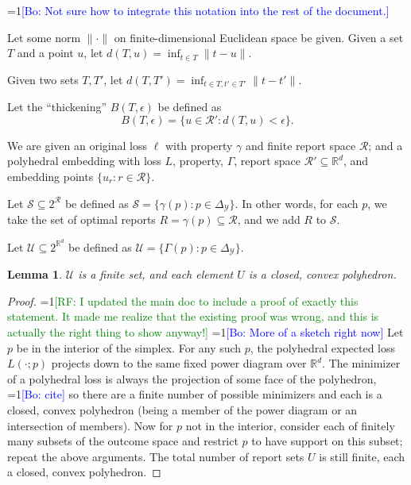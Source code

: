 \documentclass{article}
\newcommand{\Comments}{1}
\newcommand{\mynote}[2]{\ifnum\Comments=1\textcolor{#1}{#2}\fi}
\newcommand{\raf}[1]{\mynote{green}{[RF: #1]}}
\newcommand{\bo}[1]{\mynote{blue}{[Bo: #1]}}
\newcommand{\reals}{\mathbb{R}}
\newcommand{\R}{\mathcal{R}}
\newcommand{\Y}{\mathcal{Y}}
\newtheorem{lemma}{Lemma}
\theoremstyle{definition}
\begin{document}
\bo{Not sure how to integrate this notation into the rest of the document.}

Let some norm $\|\cdot\|$ on finite-dimensional Euclidean space be given.
Given a set $T$ and a point $u$, let $d(T,u) = \inf_{t \in T} \|t-u\|$.

Given two sets $T,T'$, let $d(T,T') = \inf_{t\in T, t' \in T'} \|t-t'\|$.

Let the ``thickening'' $B(T,\epsilon)$ be defined as
  \[ B(T,\epsilon) = \{u \in \R' : d(T,u) < \epsilon \} . \]

We are given an original loss $\ell$ with property $\gamma$ and finite report space $\R$; and a polyhedral embedding with loss $L$, property, $\Gamma$, report space $\R' \subseteq \reals^d$, and embedding points $\{u_r : r \in \R\}$.


Let $\mathcal{S} \subseteq 2^{\R}$ be defined as $\mathcal{S} = \{\gamma(p) : p \in \Delta_{\Y}\}$.
In other words, for each $p$, we take the set of optimal reports $R = \gamma(p) \subseteq \R$, and we add $R$ to $\mathcal{S}$.

Let $\mathcal{U} \subseteq 2^{\reals^d}$ be defined as $\mathcal{U} = \{\Gamma(p) : p \in \Delta_{\Y}\}$.

\begin{lemma} \label{lemma:U-convex-closed}
  $\mathcal{U}$ is a finite set, and each element $U$ is a closed, convex polyhedron.
\end{lemma}
\begin{proof}
  \raf{I updated the main doc to include a proof of exactly this statement.  It made me realize that the existing proof was wrong, and this is actually the right thing to show anyway!}
  \bo{More of a sketch right now}
  Let $p$ be in the interior of the simplex.
  For any such $p$, the polyhedral expected loss $L(\cdot;p)$ projects down to the same fixed power diagram over $\reals^d$.
  The minimizer of a polyhedral loss is always the projection of some face of the polyhedron, \bo{cite} so there are a finite number of possible minimizers and each is a closed, convex polyhedron (being a member of the power diagram or an intersection of members).
  Now for $p$ not in the interior, consider each of finitely many subsets of the outcome space and restrict $p$ to have support on this subset; repeat the above arguments.
  The total number of report sets $U$ is still finite, each a closed, convex polyhedron.
\end{proof}
\end{document}
